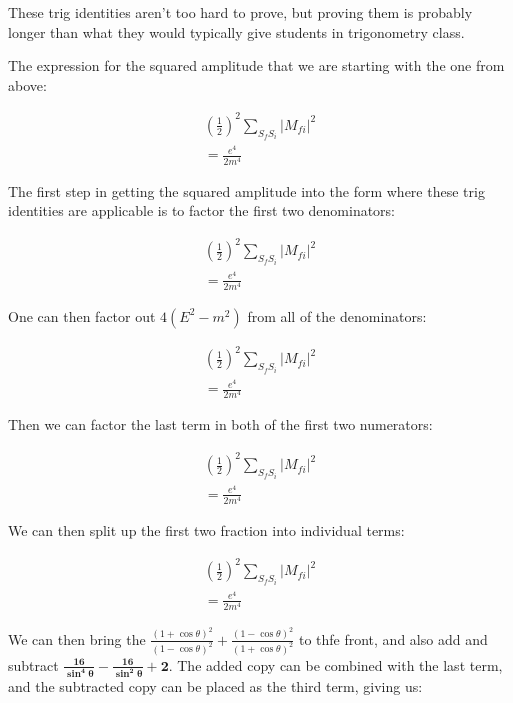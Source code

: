 \documentclass[a4]{article}
\begin{document}
    These trig identities aren't too hard to prove, but proving them is probably longer than what they would typically give students in trigonometry class.

    The expression for the squared amplitude that we are starting with the one from above:

    \begin{eqnarray}
        (\frac{1}{2})^2 \sum_{S_f S_i} |M_{f i}|^2 \\
        = \frac{e^4}{2 m^4}
    \end{eqnarray}

    The first step in getting the squared amplitude into the form where these trig identities are applicable is to factor the first two denominators:

    \begin{eqnarray}
        (\frac{1}{2})^2 \sum_{S_f S_i} |M_{f i}|^2 \\
        = \frac{e^4}{2 m^4}
    \end{eqnarray}

    One can then factor out $4 (E^2 - m^2)$ from all of the denominators:

    \begin{eqnarray}
        (\frac{1}{2})^2 \sum_{S_f S_i} |M_{f i}|^2 \\
        = \frac{e^4}{2 m^4}
    \end{eqnarray}

    Then we can factor the last term in both of the first two numerators:

    \begin{eqnarray}
        (\frac{1}{2})^2 \sum_{S_f S_i} |M_{f i}|^2 \\
        = \frac{e^4}{2 m^4}
    \end{eqnarray}

    We can then split up the first two fraction into individual terms:

    \begin{eqnarray}
        (\frac{1}{2})^2 \sum_{S_f S_i} |M_{f i}|^2 \\
        = \frac{e^4}{2 m^4}
    \end{eqnarray}

    We can then bring the $\frac{(1 + \cos \theta)^2}{(1 - \cos \theta)^2} + \frac{(1 - \cos \theta)^2}{(1 + \cos \theta)^2}$ to thfe front, and also add and subtract $\mathbf{\frac{16}{\sin^4 \theta} - \frac{16}{\sin^2 \theta} + 2}$. The added
    copy can be combined with the last term, and the subtracted copy can be placed as the third term, giving us:
\end{document}
